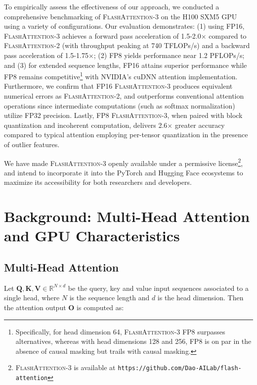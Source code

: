 \begin{enumerate}
To empirically assess the effectiveness of our approach, we conducted a comprehensive benchmarking of \textsc{FlashAttention-3} on the H100 SXM5 GPU using a variety of configurations. Our evaluation demonstrates: (1) using FP16, \textsc{FlashAttention-3} achieves a forward pass acceleration of 1.5-2.0$\times$ compared to \textsc{FlashAttention-2} (with throughput peaking at 740 TFLOPs/s) and a backward pass acceleration of 1.5-1.75$\times$; (2) FP8 yields performance near 1.2 PFLOPs/s; and (3) for extended sequence lengths, FP16 attains superior performance while FP8 remains competitive\footnote{Specifically, for head dimension 64, \textsc{FlashAttention-3} FP8 surpasses alternatives, whereas with head dimensions 128 and 256, FP8 is on par in the absence of causal masking but trails with causal masking.} with NVIDIA’s cuDNN attention implementation. Furthermore, we confirm that FP16 \textsc{FlashAttention-3} produces equivalent numerical errors as \textsc{FlashAttention-2}, and outperforms conventional attention operations since intermediate computations (such as softmax normalization) utilize FP32 precision. Lastly, FP8 \textsc{FlashAttention-3}, when paired with block quantization and incoherent computation, delivers 2.6$\times$ greater accuracy compared to typical attention employing per-tensor quantization in the presence of outlier features.

We have made \textsc{FlashAttention-3} openly available under a permissive license\footnote{\textsc{FlashAttention-3}
  is available at \texttt{https://github.com/Dao-AILab/flash-attention}}, and intend to incorporate it into the PyTorch and Hugging Face ecosystems to maximize its accessibility for both researchers and developers.

\section{Background: Multi-Head Attention and GPU Characteristics}
\label{sec:background}

\subsection{Multi-Head Attention}
\label{subsec:multi_head_attn}

Let $\mathbf{Q}, \mathbf{K}, \mathbf{V} \in \mathbb{R}^{N \times d}$ be the query, key and value input sequences associated to a single head, where $N$ is the sequence length and $d$ is the head dimension. Then the attention output $\mathbf{O}$ is computed as:


\end{enumerate}
